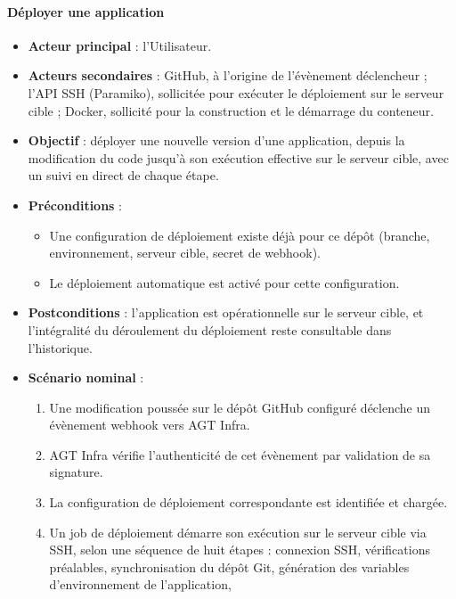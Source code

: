 \paragraph{Déployer une application}
\begin{itemize}
  \item \textbf{Acteur principal} : l'Utilisateur.
  \item \textbf{Acteurs secondaires} : GitHub, à l'origine de l'évènement
        déclencheur ; l'API SSH (Paramiko), sollicitée pour exécuter le
        déploiement sur le serveur cible ; Docker, sollicité pour la
        construction et le démarrage du conteneur.
  \item \textbf{Objectif} : déployer une nouvelle version d'une
        application, depuis la modification du code jusqu'à son exécution
        effective sur le serveur cible, avec un suivi en direct de chaque
        étape.
  \item \textbf{Préconditions} :
        \begin{itemize}
          \item Une configuration de déploiement existe déjà pour ce
                dépôt (branche, environnement, serveur cible, secret de
                webhook).
          \item Le déploiement automatique est activé pour cette configuration.
        \end{itemize}
  \item \textbf{Postconditions} : l'application est opérationnelle sur le
        serveur cible, et l'intégralité du déroulement du déploiement
        reste consultable dans l'historique.
  \item \textbf{Scénario nominal} :
        \begin{enumerate}
          \item Une modification poussée sur le dépôt GitHub configuré déclenche
                un évènement webhook vers AGT Infra.
          \item AGT Infra vérifie l'authenticité de cet évènement par
                validation de sa signature.
          \item La configuration de déploiement correspondante est
                identifiée et chargée.
          \item Un job de déploiement démarre son exécution sur le
                serveur cible via SSH, selon une séquence de huit étapes :
                connexion SSH, vérifications préalables, synchronisation
                du dépôt Git, génération des variables d'environnement de l'application,

\end{enumerate}
\end{itemize}

